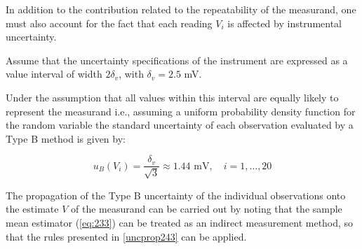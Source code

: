 \documentclass[../main.tex]{subfiles}
\begin{document}
In addition to the contribution related to the repeatability of the measurand, one must also account for the fact that each reading $V_i$ is affected by instrumental uncertainty. 

Assume that the uncertainty specifications of the instrument are expressed as a value interval of width $2 \delta_v$, with $\delta_v = 2.5 $ mV.

Under the assumption that all values within this interval are equally likely to represent the measurand i.e., assuming a uniform probability density function for the random variable the standard uncertainty of each observation evaluated by a Type B method is given by:

\begin{equation}
	u_B(V_i) = \frac{\delta_v}{\sqrt{3}} \approx 1.44 \text{ mV}, \quad i = 1, \ldots, 20
\end{equation}

The propagation of the Type B uncertainty of the individual observations onto the estimate $V$ of the measurand can be carried out by noting that the sample mean estimator (\autoref{eq:233}) can be treated as an indirect measurement method, so that the rules presented in \autoref{uncprop243} can be applied.\\
\end{document}
